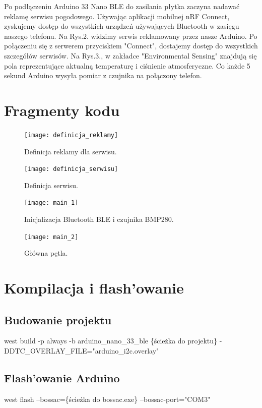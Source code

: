 \documentclass[11pt]{article} %
\begin{document}
Po podłączeniu Arduino 33 Nano BLE do zasilania płytka zaczyna nadawać reklamę serwisu pogodowego. Używając aplikacji mobilnej nRF Connect, zyskujemy dostęp do wszystkich urządzeń używających Bluetooth w zasięgu naszego telefonu. Na Rys.2. widzimy serwis reklamowany przez nasze Arduino. Po połączeniu się z serwerem przyciskiem "Connect", dostajemy dostęp do wszystkich szczegółów serwisów. Na Rys.3., w zakładce "Environmental Sensing" znajdują się pola reprezentujące aktualną temperaturę i ciśnienie atmosferyczne. Co każde 5 sekund Arduino wysyła pomiar z czujnika na połączony telefon.

\section{Fragmenty kodu}

\begin{figure}[H]
\centering
\texttt{[image: definicja\_reklamy]}
\caption{Definicja reklamy dla serwisu.}
\end{figure}

\begin{figure}[H]
\centering
\texttt{[image: definicja\_serwisu]}
\caption{Definicja serwisu.}
\end{figure}

\begin{figure}[H]
\centering
\texttt{[image: main\_1]}
\caption{Inicjalizacja Bluetooth BLE i czujnika BMP280.}
\end{figure}

\begin{figure}[H]
\centering
\texttt{[image: main\_2]}
\caption{Główna pętla.}
\end{figure}

\section{Kompilacja i flash'owanie}

\subsection{Budowanie projektu}

west build -p always -b arduino\_nano\_33\_ble \{ścieżka do projektu\}
\newline
\tab\tab-DDTC\_OVERLAY\_FILE="arduino\_i2c.overlay"

\subsection{Flash'owanie Arduino}
west flash --bossac=\{ścieżka do bossac.exe\} --bossac-port="COM3"
\end{document}
